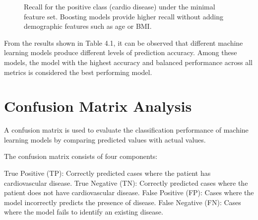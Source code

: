 \begin{figure}[htbp]
\centering
{}
\caption{Recall for the positive class (cardio disease) under the minimal feature set. Boosting models provide higher recall without adding demographic features such as age or BMI.}
\label{fig:minimal_recall_bar}
\end{figure}

\clearpage

From the results shown in Table 4.1, it can be observed that different machine learning models produce different levels of prediction accuracy. Among these models, the model with the highest accuracy and balanced performance across all metrics is considered the best performing model.

\section{Confusion Matrix Analysis}

A confusion matrix is used to evaluate the classification performance of machine learning models by comparing predicted values with actual values.

The confusion matrix consists of four components:

True Positive (TP): Correctly predicted cases where the patient has cardiovascular disease.
True Negative (TN): Correctly predicted cases where the patient does not have cardiovascular disease.
False Positive (FP): Cases where the model incorrectly predicts the presence of disease.
False Negative (FN): Cases where the model fails to identify an existing disease.

